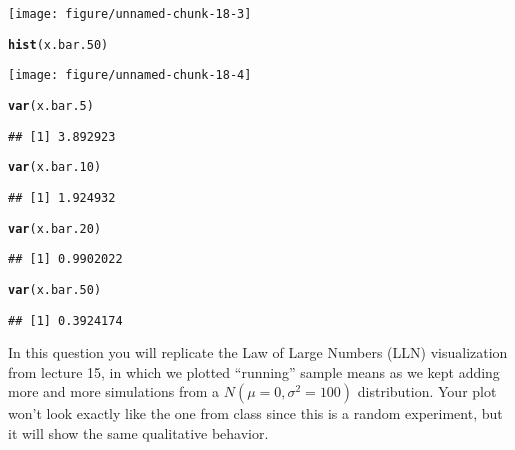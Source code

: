 \documentclass[addpoints,12pt]{exam}\usepackage[]{graphicx}\usepackage[]{color}
\makeatletter
\def\maxwidth{ %
  \ifdim\Gin@nat@width>\linewidth
    \linewidth
  \else
    \Gin@nat@width
  \fi
}
\newcommand{\hlstd}[1]{\textcolor[rgb]{0.345,0.345,0.345}{#1}}%
\newcommand{\hlkwd}[1]{\textcolor[rgb]{0.737,0.353,0.396}{\textbf{#1}}}%
\newenvironment{kframe}{%
 \def\at@end@of@kframe{}%
 \ifinner\ifhmode%
  \def\at@end@of@kframe{\end{minipage}}%
  \begin{minipage}{\columnwidth}%
 \fi\fi%
 \def\FrameCommand##1{\hskip\@totalleftmargin \hskip-\fboxsep
 \colorbox{shadecolor}{##1}\hskip-\fboxsep
     \hskip-\linewidth \hskip-\@totalleftmargin \hskip\columnwidth}%
 \MakeFramed {\advance\hsize-\width
   \@totalleftmargin\z@ \linewidth\hsize
   \@setminipage}}%
 {\par\unskip\endMakeFramed%
 \at@end@of@kframe}
\newenvironment{knitrout}{}{} %
\makeatother
\begin{document}
\begin{questions}
\begin{parts}
\begin{solution}
\begin{knitrout}
{\centering \texttt{[image: figure/unnamed-chunk-18-3]} 

}


\begin{kframe}\begin{alltt}
\hlkwd{hist}\hlstd{(x.bar.50)}
\end{alltt}
\end{kframe}

{\centering \texttt{[image: figure/unnamed-chunk-18-4]} 

}


\begin{kframe}\begin{alltt}
\hlkwd{var}\hlstd{(x.bar.5)}
\end{alltt}
\begin{verbatim}
## [1] 3.892923
\end{verbatim}
\begin{alltt}
\hlkwd{var}\hlstd{(x.bar.10)}
\end{alltt}
\begin{verbatim}
## [1] 1.924932
\end{verbatim}
\begin{alltt}
\hlkwd{var}\hlstd{(x.bar.20)}
\end{alltt}
\begin{verbatim}
## [1] 0.9902022
\end{verbatim}
\begin{alltt}
\hlkwd{var}\hlstd{(x.bar.50)}
\end{alltt}
\begin{verbatim}
## [1] 0.3924174
\end{verbatim}
\end{kframe}
\end{knitrout}
\end{solution}
	\end{parts}
\question In this question you will replicate the Law of Large Numbers (LLN) visualization from lecture 15, in which we plotted ``running'' sample means as we kept adding more and more simulations from a $N(\mu = 0, \sigma^2 = 100)$ distribution. Your plot won't look exactly like the one from class since this is a random experiment, but it will show the same qualitative behavior.
    \begin{parts}

\end{parts}
\end{questions}
\end{document}
